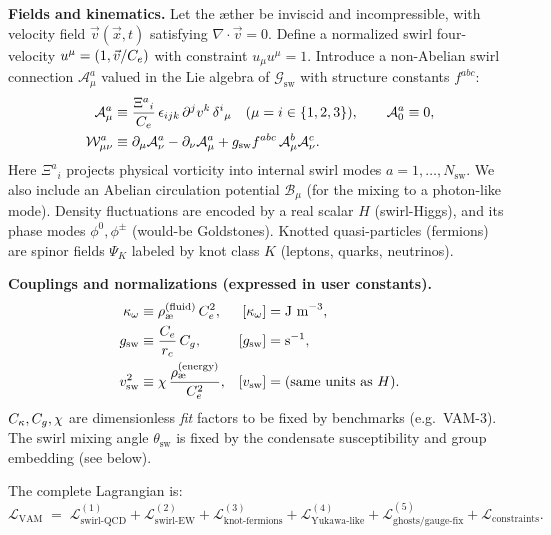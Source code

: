 \documentclass[11pt]{article}
\begin{document}
    \noindent\textbf{Fields and kinematics.}
    Let the æther be inviscid and incompressible, with velocity field \(\vec v(\vec x,t)\) satisfying \(\nabla\!\cdot\!\vec v=0\).
    Define a normalized swirl four-velocity \(u^\mu=(1,\vec v/C_e)\) with constraint \(u_\mu u^\mu=1\).
    Introduce a non-Abelian swirl connection \(\mathcal{A}_\mu^a\) valued in the Lie algebra of \(\mathcal{G}_\text{sw}\) with structure constants \(f^{abc}\):
    \begin{align}
        \mathcal{A}_\mu^a &\equiv \frac{\Xi^{a}{}_i}{C_e}\,\epsilon_{ijk}\,\partial^j v^k\, \delta^i{}_\mu \quad (\mu=i\in\{1,2,3\}),\qquad \mathcal{A}_0^a \equiv 0,\\
        \mathcal{W}_{\mu\nu}^a &\equiv \partial_\mu \mathcal{A}_\nu^a - \partial_\nu \mathcal{A}_\mu^a + g_\text{sw} f^{abc}\,\mathcal{A}_\mu^b \mathcal{A}_\nu^c.
    \end{align}
    Here \(\Xi^{a}{}_i\) projects physical vorticity into internal swirl modes \(a=1,\dots,N_\text{sw}\).
    We also include an Abelian circulation potential \(\mathcal{B}_\mu\) (for the mixing to a photon-like mode).
    Density fluctuations are encoded by a real scalar \(H\) (swirl-Higgs), and its phase modes \(\phi^0,\phi^\pm\) (would-be Goldstones).
    Knotted quasi-particles (fermions) are spinor fields \(\Psi_{K}\) labeled by knot class \(K\) (leptons, quarks, neutrinos).

    \noindent\textbf{Couplings and normalizations (expressed in user constants).}
    \begin{align}
        \kappa_\omega &\equiv \rhof\, \Ce^2,
        & [\kappa_\omega] &= \text{J m}^{-3},\\
        g_\text{sw} &\equiv \frac{\Ce}{\rc}\,\Cg,
        & [g_\text{sw}]&=\text{s}^{-1},\\
        v_\text{sw}^2 &\equiv \chi\,\frac{\rhoe}{\Ce^2},
        & [v_\text{sw}]&=\text{(same units as }H\text{)}.
    \end{align}
    \(C_\kappa,C_g,\chi\) are dimensionless \emph{fit} factors to be fixed by benchmarks (e.g.\ VAM-3).
    The swirl mixing angle \(\theta_\text{sw}\) is fixed by the condensate susceptibility and group embedding (see below).

    The complete Lagrangian is:
    \begin{equation}
        \boxed{
            \mathcal{L}_\text{VAM} \;=\;
            \mathcal{L}^{(1)}_{\text{swirl-QCD}}
            +\mathcal{L}^{(2)}_{\text{swirl-EW}}
            +\mathcal{L}^{(3)}_{\text{knot-fermions}}
            +\mathcal{L}^{(4)}_{\text{Yukawa-like}}
            +\mathcal{L}^{(5)}_{\text{ghosts/gauge-fix}}
            +\mathcal{L}_{\text{constraints}}.
        }
    \end{equation}
\end{document}
